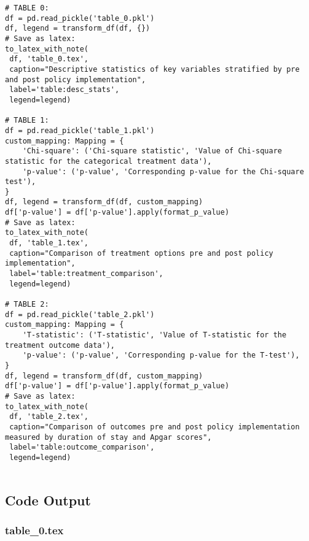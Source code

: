 \documentclass[11pt]{article}
\begin{document}
\begin{verbatim}
# TABLE 0:
df = pd.read_pickle('table_0.pkl')
df, legend = transform_df(df, {})
# Save as latex:
to_latex_with_note(
 df, 'table_0.tex',
 caption="Descriptive statistics of key variables stratified by pre and post policy implementation", 
 label='table:desc_stats',
 legend=legend)

# TABLE 1:
df = pd.read_pickle('table_1.pkl')
custom_mapping: Mapping = {
    'Chi-square': ('Chi-square statistic', 'Value of Chi-square statistic for the categorical treatment data'),
    'p-value': ('p-value', 'Corresponding p-value for the Chi-square test'),
}
df, legend = transform_df(df, custom_mapping)
df['p-value'] = df['p-value'].apply(format_p_value)
# Save as latex:
to_latex_with_note(
 df, 'table_1.tex',
 caption="Comparison of treatment options pre and post policy implementation", 
 label='table:treatment_comparison',
 legend=legend)

# TABLE 2:
df = pd.read_pickle('table_2.pkl')
custom_mapping: Mapping = {
    'T-statistic': ('T-statistic', 'Value of T-statistic for the treatment outcome data'),
    'p-value': ('p-value', 'Corresponding p-value for the T-test'),
}
df, legend = transform_df(df, custom_mapping)
df['p-value'] = df['p-value'].apply(format_p_value)
# Save as latex:
to_latex_with_note(
 df, 'table_2.tex',
 caption="Comparison of outcomes pre and post policy implementation measured by duration of stay and Apgar scores", 
 label='table:outcome_comparison',
 legend=legend)


\end{verbatim}



\subsection{Code Output}

\subsubsection*{table\_0.tex}
\end{document}
